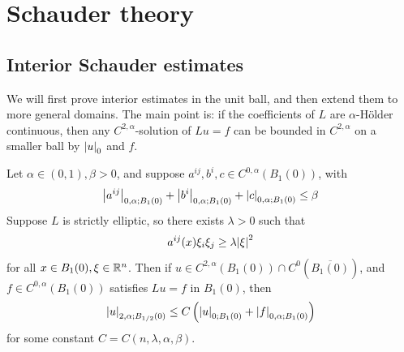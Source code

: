 \documentclass{article}
\begin{document}
\section{Schauder theory}

\subsection{Interior Schauder estimates}

We will first prove interior estimates in the unit ball, and then extend them to more general domains. The main point is: if the coefficients of \(L\) are \(\alpha\)-H\"older continuous, then any \(C^{2, \alpha}\)-solution of \(Lu = f\) can be bounded in \(C^{2, \alpha}\) on a smaller ball by \(\abs{u}_0\) and \(f\).

\begin{theorem}
    \label{thm:unit-scale-int-schauder}

    Let \(\alpha \in (0, 1), \beta > 0\), and suppose \(a^{ij}, b^i, c \in C^{0, \alpha}(B_1(0))\), with 
    \[\abs{a^{ij}}_{0, \alpha; B_1(0)} + \abs{b^i}_{0, \alpha; B_1(0)} + \abs{c}_{0, \alpha; B_1(0)} \le \beta\]
    Suppose \(L\) is strictly elliptic, so there exists \(\lambda > 0\) such that
    \[a^{ij}(x)\xi_i\xi_j \ge \lambda \abs{\xi}^2\]
    for all \(x \in B_1(0), \xi \in \mathbb{R}^n\). Then if \(u \in C^{2, \alpha}(B_1(0)) \cap C^0(\overline{B_1(0)})\), and \(f \in C^{0, \alpha}(B_1(0))\) satisfies \(Lu = f\) in \(B_1(0)\), then
    \[\abs{u}_{2, \alpha; B_{1/2}(0)} \le C\left(\abs{u}_{0; B_1(0)} + \abs{f}_{0, \alpha; B_1(0)}\right)\]
    for some constant \(C = C(n, \lambda, \alpha, \beta)\).
\end{theorem}
\end{document}
